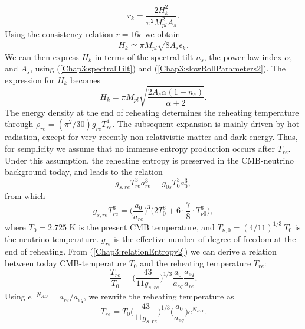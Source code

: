 \documentclass[11pt,a4paper,twoside]{book}
\begin{document}
\begin{equation}
\label{chap3:tensortToScalarRatio}
r_{k}=\frac{2H^{2}_{k}}{\pi^{2}M_{pl}^{2}A_{s}}.
\end{equation}
Using the consistency relation $ r=16\epsilon $ we obtain
\begin{equation}
	H_{k}\simeq \pi M_{pl}\sqrt{8A_{s}\epsilon_{k}}.
\end{equation}
We can then express $ H_{k} $ in terms of the spectral tilt $ n_{s} $, the power-law index $\alpha$, and $ A_{s} $, using (\ref{Chap3:spectralTilt}) and (\ref{Chap3:slowRollParameters2}). The expression for $ H_{k} $ becomes
\begin{equation}
	\label{chap3:expressionHk}
	H_{k}=\pi M_{pl}\sqrt{\frac{2A_{s}\alpha (1-n_{s})}{\alpha +2}}.
\end{equation}
The energy density at the end of reheating determines the reheating temperature through $\rho_{re}=(\pi^{2}/30)g_{re}T^{4}_{re}$. The subsequent expansion is mainly driven by hot radiation, except for very recently non-relativistic matter and dark energy. Thus, for semplicity we assume that no immense entropy production occurs after $ T_{re} $. Under this assumption, the reheating entropy is preserved in the CMB-neutrino background today, and leads to the relation
\begin{equation}
	\label{Chap3:relationEntropy}
	g_{s,re}T_{re}^{3}a_{re}^{3}=g_{0s}T_{0}^{3}a_{0}^{3},
\end{equation}
from which
\begin{equation}
	\label{Chap3:relationEntropy2}
	g_{s,re}T_{re}^{3} = \Bigg(\frac{a_{0}}{a_{re}}\Bigg)^{3}\big(2T_{0}^{3} + 6 \cdot \frac{7}{8} \cdot T_{\nu 0}^{3}\big),
\end{equation}
where $ T_{0}=2.725  $ K is the present CMB temperature, and $ T_{\nu,0}=(4/11)^{1/3}\ T_{0} $ is the neutrino temperature. $ g_{re} $ is the effective number of degree of freedom at the end of reheating. From  (\ref{Chap3:relationEntropy2}) we can derive a relation between  today CMB-temperature $ T_{0} $ and the reheating temperature $ T_{re} $:
\begin{equation}
\label{Chap3:RelationReheatingToday}
\frac{T_{re}}{T_{0}}=\Bigg(\frac{43}{11g_{s,re}}\Bigg)^{1/3}\frac{a_{0}}{a_{eq}}\frac{a_{eq}}{a_{re}}.
\end{equation}
Using $ e^{-N_{RD}} = a_{re}/a_{eq}$, we rewrite the reheating temperature as
\begin{equation}
\label{Chap3:ReheatingTemperature}
T_{re} = T_{0}\Bigg(\frac{43}{11 g_{s,re}}\Bigg)^{1/3}\Bigg(\frac{a_{0}}{a_{eq}}\Bigg)e^{N_{RD}}.
\end{equation}
\end{document}
